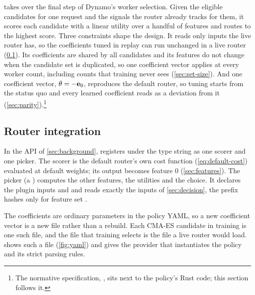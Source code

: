 \lc{} takes over the final step of Dynamo's worker selection. Given the eligible candidates for
one request and the signals the router already tracks for them, it scores each candidate with a
linear utility over a handful of features and routes to the highest score. Three constraints
shape the design. It reads only inputs the live router has, so the coefficients tuned in replay
can run unchanged in a live router (\cref{sec:integration}). Its coefficients are shared by all
candidates and its features do not change when the candidate set is duplicated, so one coefficient
vector applies at every worker count, including counts that training never sees
(\cref{sec:set-size}). And one coefficient vector, $\theta = -\mathbf{e}_{0}$, reproduces the default
router, so tuning starts from the status quo and every learned coefficient reads as a deviation
from it (\cref{sec:parity}).\footnote{The normative specification, , sits next
  to the policy's Rust code; this section follows it.}

\subsection{Router integration}
\label{sec:integration}

In the API of \cref{sec:background}, \lc{} registers under the type string
 as one scorer and one picker. The scorer is the default router's own cost
function (\cref{eq:default-cost}) evaluated at default weights; its output becomes feature 0
(\cref{sec:features}). The picker (a ) computes the other features, the
utilities and the choice.
It declares the plugin inputs  and  and reads exactly the inputs of
\cref{sec:decision}, the prefix hashes only for feature set .

The coefficients are ordinary parameters in the policy YAML, so a new coefficient vector is a new
file rather than a rebuild. Each CMA-ES candidate in training is one such file, and the file that
training selects is the file a live router would load.  shows such a file
(\cref{fig:yaml}) and gives the provider that instantiates the policy and its strict parsing rules.

